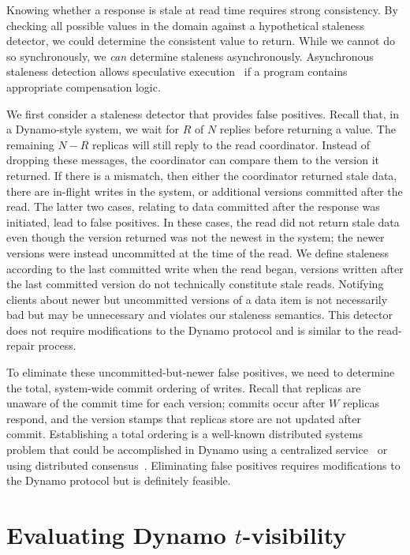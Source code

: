 \documentclass{vldb}
\newcommand{\sectionskip}{-0em}
\begin{document}
Knowing whether a response is stale at read time requires strong
consistency.  By checking all possible values in the domain against a
hypothetical staleness detector, we could determine the consistent
value to return.  While we cannot do so synchronously, we \textit{can}
determine staleness asynchronously.  Asynchronous staleness detection
allows speculative execution~\cite{nsdispeculation} if a program
contains appropriate compensation logic.

We first consider a staleness detector that provides false positives.
Recall that, in a Dynamo-style system, we wait for $R$ of $N$ replies
before returning a value.  The remaining $N-R$ replicas will still
reply to the read coordinator.  Instead of dropping these messages,
the coordinator can compare them to the version it returned.  If there
is a mismatch, then either the coordinator returned stale data, there
are in-flight writes in the system, or additional versions committed
after the read. The latter two cases, relating to data committed after
the response was initiated, lead to false positives.  In these cases,
the read did not return stale data even though the version returned
was not the newest in the system; the newer versions were instead
uncommitted at the time of the read.  We define staleness according to
the last committed write when the read began, versions written after
the last committed version do not technically constitute stale reads.
Notifying clients about newer but uncommitted versions of a data item
is not necessarily bad but may be unnecessary and violates our
staleness semantics.  This detector does not require modifications to
the Dynamo protocol and is similar to the read-repair process.

To eliminate these uncommitted-but-newer false positives, we need to
determine the total, system-wide commit ordering of writes. Recall
that replicas are unaware of the commit time for each version; commits
occur after $W$ replicas respond, and the version stamps that replicas
store are not updated after commit.  Establishing a total ordering is
a well-known distributed systems problem that could be accomplished in
Dynamo using a centralized service~\cite{zookeeper} or using
distributed consensus~\cite{paxos}.  Eliminating false positives
requires modifications to the Dynamo protocol but is definitely
feasible.



\vspace{\sectionskip}\section{Evaluating Dynamo {\large $t$}-visibility}
\label{sec:dynamoeval}
\end{document}
